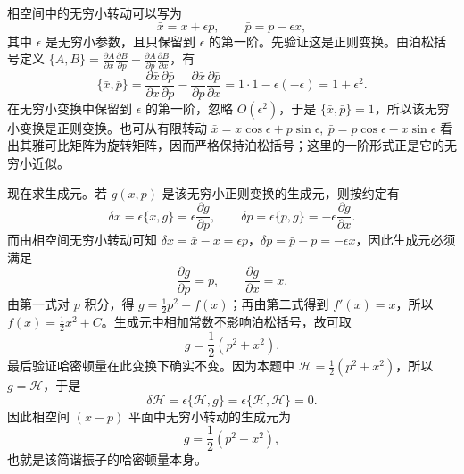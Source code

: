 \begin{solution}[相空间中的无穷小转动生成元]
\answer
相空间中的无穷小转动可以写为
\[
\bar x=x+\epsilon p,\qquad \bar p=p-\epsilon x,
\]
其中 $\epsilon$ 是无穷小参数，且只保留到 $\epsilon$ 的第一阶。先验证这是正则变换。由泊松括号定义 $\{A,B\}=\frac{\partial A}{\partial x}\frac{\partial B}{\partial p}-\frac{\partial A}{\partial p}\frac{\partial B}{\partial x}$，有
\[
\{\bar x,\bar p\}=\frac{\partial \bar x}{\partial x}\frac{\partial \bar p}{\partial p}-\frac{\partial \bar x}{\partial p}\frac{\partial \bar p}{\partial x}=1\cdot 1-\epsilon(-\epsilon)=1+\epsilon^2.
\]
在无穷小变换中保留到 $\epsilon$ 的第一阶，忽略 $O(\epsilon^2)$，于是 $\{\bar x,\bar p\}=1$，所以该无穷小变换是正则变换。也可从有限转动 $\bar x=x\cos\epsilon+p\sin\epsilon,\ \bar p=p\cos\epsilon-x\sin\epsilon$ 看出其雅可比矩阵为旋转矩阵，因而严格保持泊松括号；这里的一阶形式正是它的无穷小近似。

现在求生成元。若 $g(x,p)$ 是该无穷小正则变换的生成元，则按约定有
\[
\delta x=\epsilon\{x,g\}=\epsilon\frac{\partial g}{\partial p},\qquad 
\delta p=\epsilon\{p,g\}=-\epsilon\frac{\partial g}{\partial x}.
\]
而由相空间无穷小转动可知 $\delta x=\bar x-x=\epsilon p$，$\delta p=\bar p-p=-\epsilon x$，因此生成元必须满足
\[
\frac{\partial g}{\partial p}=p,\qquad \frac{\partial g}{\partial x}=x.
\]
由第一式对 $p$ 积分，得 $g=\frac{1}{2}p^2+f(x)$；再由第二式得到 $f'(x)=x$，所以 $f(x)=\frac{1}{2}x^2+C$。生成元中相加常数不影响泊松括号，故可取
\[
g=\frac{1}{2}(p^2+x^2).
\]
最后验证哈密顿量在此变换下确实不变。因为本题中 $\mathcal H=\frac{1}{2}(p^2+x^2)$，所以 $g=\mathcal H$，于是
\[
\delta\mathcal H=\epsilon\{\mathcal H,g\}=\epsilon\{\mathcal H,\mathcal H\}=0.
\]
因此相空间 $(x-p)$ 平面中无穷小转动的生成元为
\[
g=\frac{1}{2}(p^2+x^2),
\]
也就是该简谐振子的哈密顿量本身。
\end{solution}



